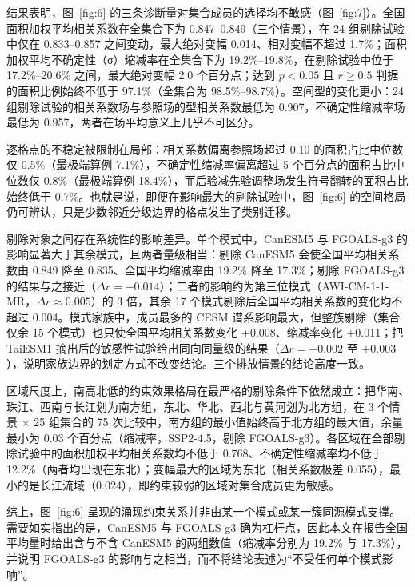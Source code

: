 \documentclass[draft]{agujournal2019}
\begin{document}
结果表明，图~\ref{fig:6} 的三条诊断量对集合成员的选择均不敏感（图~\ref{fig:7}）。全国面积加权平均相关系数在全集合下为 0.847--0.849（三个情景），在 24 组剔除试验中仅在 0.833--0.857 之间变动，最大绝对变幅 0.014、相对变幅不超过 1.7\%；面积加权平均不确定性（σ）缩减率在全集合下为 19.2\%--19.8\%，在剔除试验中位于 17.2\%--20.6\% 之间，最大绝对变幅 2.0 个百分点；达到 \(p<0.05\) 且 \(r\ge0.5\) 判据的面积比例始终不低于 97.1\%（全集合为 98.5\%--98.7\%）。空间型的变化更小：24 组剔除试验的相关系数场与参照场的型相关系数最低为 0.907，不确定性缩减率场最低为 0.957，两者在场平均意义上几乎不可区分。

逐格点的不稳定被限制在局部：相关系数偏离参照场超过 0.10 的面积占比中位数仅 0.5\%（最极端算例 7.1\%），不确定性缩减率偏离超过 5 个百分点的面积占比中位数仅 0.8\%（最极端算例 18.4\%），而后验减先验调整场发生符号翻转的面积占比始终低于 0.7\%。也就是说，即便在影响最大的剔除试验中，图~\ref{fig:6} 的空间格局仍可辨认，只是少数邻近分级边界的格点发生了类别迁移。

剔除对象之间存在系统性的影响差异。单个模式中，CanESM5 与 FGOALS-g3 的影响显著大于其余模式，且两者量级相当：剔除 CanESM5 会使全国平均相关系数由 0.849 降至 0.835、全国平均缩减率由 19.2\% 降至 17.3\%；剔除 FGOALS-g3 的结果与之接近（\(\Delta r=-0.014\)）；二者的影响约为第三位模式（AWI-CM-1-1-MR，\(\Delta r\approx0.005\)）的 3 倍，其余 17 个模式剔除后全国平均相关系数的变化均不超过 0.004。模式家族中，成员最多的 CESM 谱系影响最大，但整族剔除（集合仅余 15 个模式）也只使全国平均相关系数变化 +0.008、缩减率变化 +0.011；把 TaiESM1 摘出后的敏感性试验给出同向同量级的结果（\(\Delta r=+0.002\) 至 \(+0.003\)），说明家族边界的划定方式不改变结论。三个排放情景的结论高度一致。

区域尺度上，南高北低的约束效果格局在最严格的剔除条件下依然成立：把华南、珠江、西南与长江划为南方组，东北、华北、西北与黄河划为北方组，在 3 个情景 × 25 组集合的 75 次比较中，南方组的最小值始终高于北方组的最大值，余量最小为 0.03 个百分点（缩减率，SSP2-4.5，剔除 FGOALS-g3）。各区域在全部剔除试验中的面积加权平均相关系数均不低于 0.768、不确定性缩减率均不低于 12.2\%（两者均出现在东北）；变幅最大的区域为东北（相关系数极差 0.055），最小的是长江流域（0.024），即约束较弱的区域对集合成员更为敏感。

综上，图~\ref{fig:6} 呈现的涌现约束关系并非由某一个模式或某一簇同源模式支撑。需要如实指出的是，CanESM5 与 FGOALS-g3 确为杠杆点，因此本文在报告全国平均量时给出含与不含 CanESM5 的两组数值（缩减率分别为 19.2\% 与 17.3\%），并说明 FGOALS-g3 的影响与之相当，而不将结论表述为``不受任何单个模式影响''。
\end{document}

